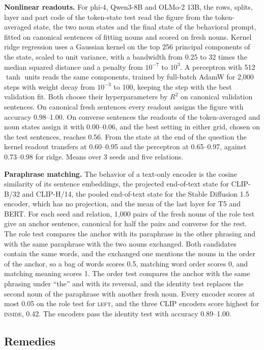 \documentclass[10pt]{article}
\theoremstyle{plain}
\theoremstyle{remark}
\begin{document}
\textbf{Nonlinear readouts.}\label{app:e19} For phi-4, Qwen3-8B and OLMo-2 13B, the rows, splits, layer and part code of the token-state test read the figure from the token-averaged state, the two noun states and the final state of the behavioral prompt, fitted on canonical sentences of fitting nouns and scored on fresh nouns. Kernel ridge regression uses a Gaussian kernel on the top 256 principal components of the state, scaled to unit variance, with a bandwidth from 0.25 to 32 times the median squared distance and a penalty from $10^{-7}$ to $10^{3}$. A perceptron with 512 $\tanh$ units reads the same components, trained by full-batch AdamW for 2{,}000 steps with weight decay from $10^{-3}$ to 100, keeping the step with the best validation fit. Both choose their hyperparameters by $R^2$ on canonical validation sentences. On canonical fresh sentences every readout assigns the figure with accuracy 0.98--1.00. On converse sentences the readouts of the token-averaged and noun states assign it with 0.00--0.06, and the best setting in either grid, chosen on the test sentences, reaches 0.56. From the state at the end of the question the kernel readout transfers at 0.60--0.95 and the perceptron at 0.65--0.97, against 0.73--0.98 for ridge. Means over 3 seeds and five relations.

\textbf{Paraphrase matching.}\label{app:e18} The behavior of a text-only encoder is the cosine similarity of its sentence embeddings, the projected end-of-text state for CLIP-B/32 and CLIP-H/14, the pooled end-of-text state for the Stable Diffusion 1.5 encoder, which has no projection, and the mean of the last layer for T5 and BERT. For each seed and relation, 1{,}000 pairs of the fresh nouns of the role test give an anchor sentence, canonical for half the pairs and converse for the rest. The role test compares the anchor with its paraphrase in the other phrasing and with the same paraphrase with the two nouns exchanged. Both candidates contain the same words, and the exchanged one mentions the nouns in the order of the anchor, so a bag of words scores 0.5, matching word order scores 0, and matching meaning scores 1. The order test compares the anchor with the same phrasing under ``the'' and with its reversal, and the identity test replaces the second noun of the paraphrase with another fresh noun. Every encoder scores at most 0.05 on the role test for \textsc{left}, and the three CLIP encoders score highest for \textsc{inside}, 0.42. The encoders pass the identity test with accuracy 0.89--1.00.

\subsection{Remedies}
\label{app:remedies}
\end{document}

